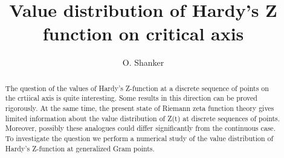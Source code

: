 \documentclass{mcom-l}
\theoremstyle{definition}
\theoremstyle{remark}
\numberwithin{equation}{section}
\begin{document}
\title{Value distribution of Hardy's Z function on critical axis}


\author{O. Shanker}
\address{200 East Dana Street, B41, Mountain View, CA 94041, U. S. A.}



\date{}


\begin{abstract}
The question of the values of Hardy's Z-function at a discrete sequence of points on the crtiical axis is quite interesting. Some results in this direction can be proved rigorously. At the same time, the present state of Riemann zeta function theory gives limited information about the value distribution of Z(t) at discrete sequences of points. Moreover, possibly these analogues could differ significantly from the continuous case. To investigate the question we perform a numerical study of the value distribution of Hardy's Z-function at generalized Gram points. 

\end{abstract}

\maketitle






\end{document}
